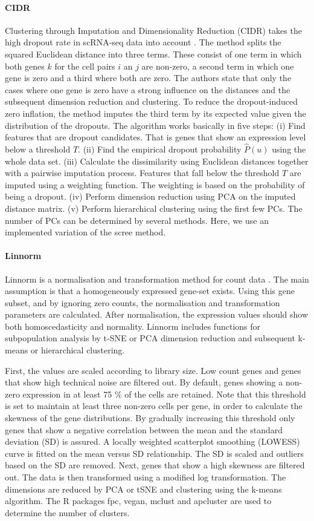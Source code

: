 \documentclass[12pt, a4paper]{article}\usepackage[]{graphicx}\usepackage[]{color}
\begin{document}
\paragraph{CIDR}
Clustering through Imputation and Dimensionality Reduction (CIDR) takes the high dropout rate in scRNA-seq data into account \citep{lin2017cidr}. The method splits the squared Euclidean distance into three terms. These consist of one term in which both genes $k$ for the cell pairs $i$ an $j$ are non-zero, a second term in which one gene is zero and a third where both are zero. The authors state that only the cases where one gene is zero have a strong influence on the distances and the subsequent dimension reduction and clustering. To reduce the dropout-induced zero inflation, the method imputes the third term by its expected value given the distribution of the dropouts. 
The algorithm works basically in five steps: (i) Find features that are dropout candidates. That is genes that show an expression level below a threshold $T$. (ii) Find the empirical dropout probability $\hat P(u)$ using the whole data set. (iii) Calculate the dissimilarity using Euclidean distances together with a pairwise imputation process. Features that fall below the threshold $T$ are imputed using a weighting function. The weighting is based on the probability of being a dropout. (iv) Perform dimension reduction using PCA on the imputed distance matrix. (v) Perform hierarchical clustering using the first few PCs. The number of PCs can be determined by several methods. Here, we use an implemented variation of the scree method. 
\paragraph{Linnorm }
Linnorm is a normalisation and transformation method for count data \citep{yip2017linnorm}. The main assumption is that a homogeneously expressed gene-set exists. Using this gene subset, and by ignoring zero counts, the normalisation and transformation parameters are calculated. After normalisation, the expression values should show both homoscedasticity and normality. Linnorm includes functions for subpopulation analysis by t-SNE or PCA dimension reduction and subsequent k-means or hierarchical clustering. 

First, the values are scaled according to library size. Low count genes and genes that show high technical noise are filtered out. By default, genes showing a non-zero expression in at least 75 \% of the cells are retained. Note that this threshold is set to maintain at least three non-zero cells per gene, in order to calculate the skewness of the gene distributions. By gradually increasing this threshold only genes that show a negative correlation between the mean and the standard deviation (SD) is assured. 
A locally weighted scatterplot smoothing (LOWESS) curve is fitted on the mean versus SD relationship. The SD is scaled and outliers based on the SD are removed. Next, genes that show a high skewness are filtered out. The data is then transformed using a modified log transformation.
The dimensions are reduced by PCA or tSNE and clustering using the k-means algorithm. The R packages fpc, vegan, mclust and apcluster are used to determine the number of clusters.
\end{document}
